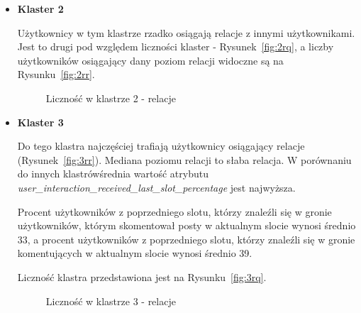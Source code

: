 \documentclass[polish,12pt]{aghthesis}
\begin{document}
\begin{itemize}
\item \textbf{Klaster 2}

Użytkownicy w tym klastrze rzadko osiągają relacje z innymi użytkownikami. Jest to drugi pod względem liczności klaster - Rysunek~\ref{fig:2rq}, a liczby użytkowników osiągający dany poziom relacji widoczne są na Rysunku~\ref{fig:2rr}.

            \begin{figure}[ht] 
    \centering
    \hfill%
    \caption{Liczność w klastrze 2 - relacje}
    \label{f:2r}
    \end{figure}


    \item \textbf{Klaster 3}
    
    Do tego klastra najczęściej trafiają użytkownicy osiągający relacje (Rysunek~\ref{fig:3rr}). Mediana poziomu relacji to słaba relacja. W porównaniu do innych klastrówśrednia wartość atrybutu \textit{user\_interaction\_received\_last\_slot\_percentage} jest najwyższa.
    
    Procent użytkowników z poprzedniego slotu, którzy znaleźli się w gronie użytkowników, którym skomentował posty w aktualnym slocie wynosi średnio 33, a procent użytkowników z poprzedniego slotu, którzy znaleźli się w gronie komentujących w aktualnym slocie wynosi średnio 39.
    
    Liczność klastra przedstawiona jest na Rysunku~\ref{fig:3rq}.
    
                \begin{figure}[ht] 
    \centering
    \hfill%
    \caption{Liczność w klastrze 3 - relacje}
    \label{f:3r}
    \end{figure}
    
    \FloatBarrier
    
    
\end{itemize}
\end{document}
